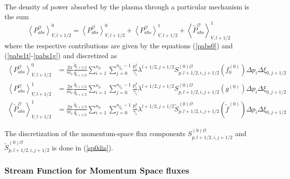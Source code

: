 The density of power absorbed by the plasma through a particular mechanism is
the sum
\[
\left\langle P_{abs}^{\mathcal{O}}\right\rangle _{V,l+1/2}^{0}=\left\langle
P_{abs}^{\mathcal{O}}\right\rangle _{V,l+1/2}^{0}+\left\langle P_{abs}%
^{\mathcal{O}}\right\rangle _{V,l+1/2}^{1}+\left\langle \widetilde{P}%
_{abs}^{\mathcal{O}}\right\rangle _{V,l+1/2}^{1}%
\]
where the respective contributions are given by the equations (\ref{pabs0})
and (\ref{pabs1t}-\ref{pabs1g}) and discretized as%
\begin{align}
\left\langle P_{abs}^{\mathcal{O}}\right\rangle _{V,l+1/2}^{0}  &  =\frac
{2\pi}{m_{e}}\frac{\widetilde{q}_{l+1/2}}{\widehat{q}_{l+1/2}}\sum
_{i=1}^{n_{p}}\sum_{j=0}^{n_{\xi_{0}}-1}\frac{p_{i}^{3}}{\gamma_{i}}%
\lambda^{l+1/2,j+1/2}S_{p,l+1/2,i,j+1/2}^{\left(  0\right)  \mathcal{O}%
}\left(  f_{0}^{\left(  0\right)  }\right)  \Delta p_{i}\Delta\xi
_{0,j+1/2}\label{pabsdis}\\
\left\langle P_{abs}^{\mathcal{O}}\right\rangle _{V,l+1/2}^{1}  &  =\frac
{2\pi}{m_{e}}\frac{\widetilde{q}_{l+1/2}}{\widehat{q}_{l+1/2}}\sum
_{i=1}^{n_{p}}\sum_{j=0}^{n_{\xi_{0}}-1}\frac{p_{i}^{3}}{\gamma_{i}}%
\lambda^{l+1/2,j+1/2}S_{p,l+1/2,i,j+1/2}^{\left(  0\right)  \mathcal{O}%
}\left(  g^{\left(  0\right)  }\right)  \Delta p_{i}\Delta\xi_{0,j+1/2}\\
\left\langle \widetilde{P}_{abs}^{\mathcal{O}}\right\rangle _{V,l+1/2}^{1}  &
=\frac{2\pi}{m_{e}}\frac{\widetilde{q}_{l+1/2}}{\widehat{q}_{l+1/2}}\sum
_{i=1}^{n_{p}}\sum_{j=0}^{n_{\xi_{0}}-1}\frac{p_{i}^{3}}{\gamma_{i}}%
\lambda^{l+1/2,j+1/2}\widetilde{S}_{p,l+1/2,i,j+1/2}^{\left(  0\right)
\mathcal{O}}\left(  \widetilde{f}^{\left(  0\right)  }\right)  \Delta
p_{i}\Delta\xi_{0,j+1/2}%
\end{align}

The discretization of the momentum-space flux components $S_{p,l+1/2,i,j+1/2}%
^{\left(  0\right)  \mathcal{O}}$ and $\widetilde{S}_{p,l+1/2,i,j+1/2}%
^{\left(  0\right)  \mathcal{O}}$ is done in (\ref{sp0dis}).

\subsubsection{Stream Function for Momentum Space fluxes}

